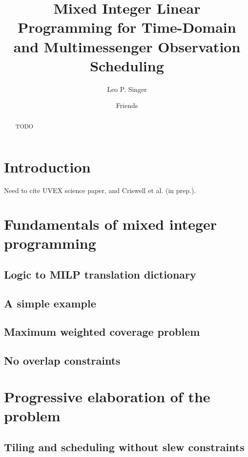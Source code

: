 \documentclass[twocolumn,times]{aastex631}
\begin{document}
\title{Mixed Integer Linear Programming for Time-Domain and Multimessenger Observation Scheduling}

\author[0000-0001-9898-5597]{Leo P. Singer}

\author{Friends}

\begin{abstract}
TODO
\end{abstract}


\section{Introduction} \label{sec:intro}

Need to cite UVEX science paper, \citet{2021arXiv211115608K} and Criswell et al. (in prep.).

\section{Fundamentals of mixed integer programming}

\subsection{Logic to MILP translation dictionary}

\subsection{A simple example}

\subsection{Maximum weighted coverage problem}

\subsection{No overlap constraints}

\section{Progressive elaboration of the problem}

\subsection{Tiling and scheduling without slew constraints}
\end{document}
